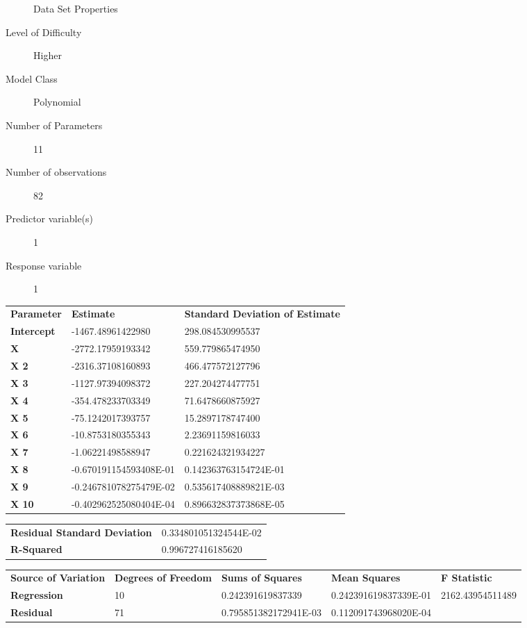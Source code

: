 \documentclass[10pt]{article}
\begin{document}
\begin{description}
   \item[]Data Set Properties
   \item[Level of Difficulty] Higher
   \item[Model Class] Polynomial
   \item[Number of Parameters] 11
   \item[Number of observations]82
   \item[Predictor variable(s)]1
   \item[Response variable]1
\end{description}

\begin{tabular}{lll}
   \textbf{Parameter} & \textbf{Estimate} & \textbf{Standard Deviation of Estimate}  \\ 
   \textbf{Intercept} &-1467.48961422980    &    298.084530995537 \\ 
	\textbf{X} &  -2772.17959193342     &   559.779865474950  \\ 
   \textbf{X 2} &   -2316.37108160893   &     466.477572127796  \\ 
   \textbf{X 3} &   -1127.97394098372   &     227.204274477751  \\ 
   \textbf{X 4} &   -354.478233703349    &    71.6478660875927  \\ 
   \textbf{X 5} &   -75.1242017393757    &    15.2897178747400  \\ 
   \textbf{X 6} &  -10.8753180355343    &    2.23691159816033 \\ 
   \textbf{X 7} &    -1.06221498588947   &     0.221624321934227   \\ 
   \textbf{X 8} &   -0.670191154593408E-01  &      0.142363763154724E-01   \\ 
   \textbf{X 9} &   -0.246781078275479E-02   &     0.535617408889821E-03   \\ 
   \textbf{X 10} &   -0.402962525080404E-04    &    0.896632837373868E-05  \\ 
\end{tabular} 

\begin{tabular}{ll}
    \textbf{Residual Standard Deviation} &  0.334801051324544E-02  \\ 
    \textbf{R-Squared} &  0.996727416185620   \\  
\end{tabular}


\begin{tabular}{lllll}
   \textbf{Source of Variation} & \textbf{Degrees of Freedom} & \textbf{Sums of Squares} & \textbf{Mean Squares}  & \textbf{F Statistic} \\ 
   \textbf{Regression} & 10 & 0.242391619837339 &  0.242391619837339E-01	& 2162.43954511489   \\ 
	\textbf{Residual} &  71  & 0.795851382172941E-03 &	0.112091743968020E-04  \\ 
\end{tabular} 
\end{document}
